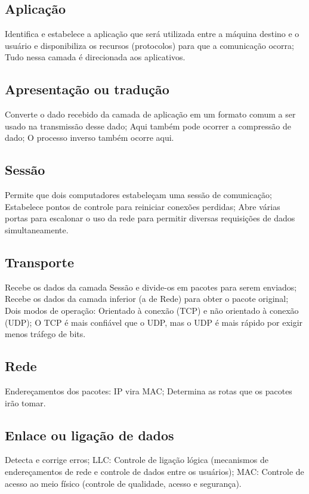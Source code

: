 \documentclass{article}
\begin{document}
\subsection{Aplicação}
Identifica e estabelece a aplicação que será utilizada entre a máquina destino e
o usuário e disponibiliza os recursos (protocolos) para que a comunicação
ocorra; Tudo nessa camada é direcionada aos aplicativos.

\subsection{Apresentação ou tradução}
Converte o dado recebido da camada de aplicação em um formato comum a ser usado
na transmissão desse dado; Aqui também pode ocorrer a compressão de dado; O
processo inverso também ocorre aqui.

\subsection{Sessão}
Permite que dois computadores estabeleçam uma sessão de comunicação; Estabelece
pontos de controle para reiniciar conexões perdidas; Abre várias portas para
escalonar o uso da rede para permitir diversas requisições de dados
simultaneamente.

\subsection{Transporte}
Recebe os dados da camada Sessão e divide-os em pacotes para serem enviados;
Recebe os dados da camada inferior (a de Rede) para obter o pacote original; \\
Dois modos de operação: Orientado à conexão (TCP) e não orientado à conexão
(UDP); O TCP é mais confiável que o UDP, mas o UDP é mais rápido por exigir
menos tráfego de bits.

\subsection{Rede}
Endereçamentos dos pacotes: IP vira MAC; Determina as rotas que os pacotes irão
tomar.

\subsection{Enlace ou ligação de dados}
Detecta e corrige erros; LLC: Controle de ligação lógica (mecanismos de
endereçamentos de rede e controle de dados entre os usuários); MAC: Controle de
acesso ao meio físico (controle de qualidade, acesso e segurança).
\end{document}
